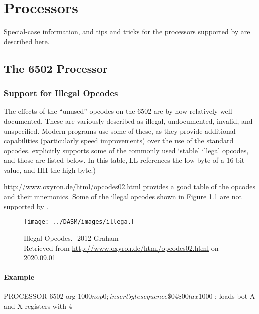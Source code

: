 \label{changelog20200901_nop3}

\chapter{Processors}

Special-case information, and tips and tricks for the processors supported by \dasm are described here.

\section{The 6502 Processor}

\subsection{Support for Illegal Opcodes}

The effects of the ``unused'' opcodes on the 6502 are by now relatively well documented. These are variously described as illegal, undocumented, invalid, and unspecified. Modern programs use some of these, as they provide additional capabilities (particularly speed improvements) over the use of the standard opcodes. \dasm explicitly supports some of the commonly used `stable' illegal opcodes, and those are listed below. In this table, LL references the low byte of a 16-bit value, and HH the high byte.)

\url{http://www.oxyron.de/html/opcodes02.html} provides a good table of the opcodes and their mnemonics.  Some of the illegal opcodes shown in Figure \ref{fig:IllegalOp}  are not supported by \dasm.

\begin{landscape}
\begin{figure}[h]
\centering
\texttt{[image: ../DASM/images/illegal]}
\caption{Illegal Opcodes. -2012 Graham\\Retrieved from \url{http://www.oxyron.de/html/opcodes02.html} on 2020.09.01\\
}
\label{fig:IllegalOp}
\end{figure}

\end{landscape}

\subsubsection{Example}
\begin{code}
  PROCESSOR 6502
  org $1000
  nop 0       ; insert byte sequence \$04 \$00
  lax $1000   ; loads bot A and X registers with 4
\end{code}



